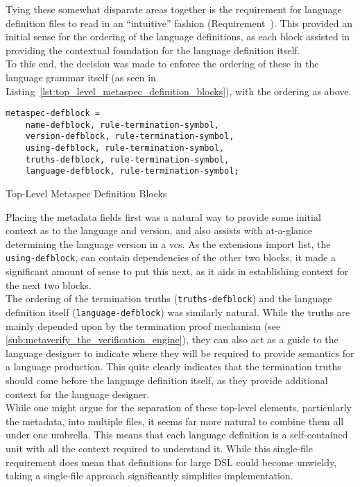 Tying these somewhat disparate areas together is the requirement for language definition files to read in an ``intuitive'' fashion (Requirement~). 
This provided an initial sense for the ordering of the language definitions, as each block assisted in providing the contextual foundation for the language definition itself. \\

To this end, the decision was made to enforce the ordering of these in the language grammar itself (as seen in Listing~\ref{lst:top_level_metaspec_definition_blocks}), with the ordering as above.

\begin{listing}[!htb]
\begin{verbatim}
metaspec-defblock = 
    name-defblock, rule-termination-symbol, 
    version-defblock, rule-termination-symbol, 
    using-defblock, rule-termination-symbol, 
    truths-defblock, rule-termination-symbol, 
    language-defblock, rule-termination-symbol;
\end{verbatim}
\caption{Top-Level Metaspec Definition Blocks}
\label{lst:top_level_metaspec_definition_blocks}
\end{listing}

Placing the metadata fields first was a natural way to provide some initial context as to the language and version, and also assists with at-a-glance determining the language version in a \gls{vcs}.
As the extensions import list, the \texttt{using-defblock}, can contain dependencies of the other two blocks, it made a significant amount of sense to put this next, as it aids in establishing context for the next two blocks.\\

The ordering of the termination truths (\texttt{truths-defblock}) and the language definition itself (\texttt{language-defblock}) was similarly natural. 
While the truths are mainly depended upon by the termination proof mechanism (see \autoref{sub:metaverify_the_verification_engine}), they can also act as a guide to the language designer to indicate where they will be required to provide semantics for a language production. 
This quite clearly indicates that the termination truths should come before the language definition itself, as they provide additional context for the language designer.\\

While one might argue for the separation of these top-level elements, particularly the metadata, into multiple files, it seems far more natural to combine them all under one umbrella.
This means that each language definition is a self-contained unit with all the context required to understand it. 
While this single-file requirement does mean that definitions for large DSL could become unwieldy, taking a single-file approach significantly simplifies implementation.\\

